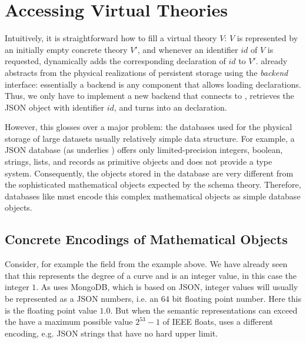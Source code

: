 \section{Accessing Virtual Theories}

Intuitively, it is straightforward how to fill a virtual theory $V$: $V$ is represented by an initially empty concrete theory $V'$, and whenever an identifier $id$ of $V$ is requested, \mmt dynamically adds the corresponding declaration of $id$ to $V'$.
\mmt already abstracts from the physical realizations of persistent storage using the \emph{backend} interface: essentially a backend is any component that allows loading declarations.
Thus, we only have to implement a new backend that connects to \lmfdb, retrieves the JSON object with identifier $id$, and turns into an \ommt declaration.

However, this glosses over a major problem: the databases used for the physical storage of large datasets usually relatively simple data structure.
For example, a JSON database (as underlies \lmfdb) offers only limited-precision integers, boolean, strings, lists, and records as primitive objects and does not provide a type system.
Consequently, the objects stored in the database are very different from the sophisticated mathematical objects expected by the schema theory.
Therefore, databases like \lmfdb must encode this complex mathematical objects as simple database objects.

\subsection{Concrete Encodings of Mathematical Objects}\label{sec:vt:translation}


Consider, for example the  field from the example above.  We have
already seen that this represents the degree of a curve and is an integer value, in this
case the integer $1$.  As \lmfdb uses MongoDB, which is based on JSON, integer values will
usually be represented as a JSON numbers, i.e. an  $64$ bit floating
point number.  Here this is the floating point value $1.0$. But when the semantic
representations can exceed the have a maximum possible value $2^{53}-1$ of IEEE floats,
\lmfdb uses a different encoding, e.g. JSON strings that have no hard upper limit.


